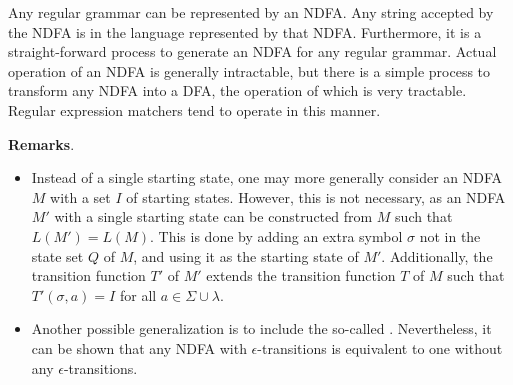 \documentclass[12pt]{article}
\begin{document}
Any regular grammar can be represented by an NDFA.  Any string accepted by the NDFA is in the language represented by that NDFA.  Furthermore, it is a straight-forward process to generate an NDFA for any regular grammar.
Actual operation of an NDFA is generally intractable, but there is a simple process to transform any NDFA into a DFA, the operation of which is very tractable.  Regular expression matchers tend to operate in this manner.

\textbf{Remarks}.  
\begin{itemize}
\item
Instead of a single starting state, one may more generally consider an NDFA $M$ with a set $I$ of starting states.  However, this is not necessary, as an NDFA $M'$ with a single starting state can be constructed from $M$ such that $L(M')=L(M)$.  This is done by adding an extra symbol $\sigma$ not in the state set $Q$ of $M$, and using it as the starting state of $M'$.  Additionally, the transition function $T'$ of $M'$ extends the transition function $T$ of $M$ such that $T'(\sigma,a)=I$ for all $a\in \Sigma\cup \lambda$.
\item
Another possible generalization is to include the so-called .  Nevertheless, it can be shown that any NDFA with $\epsilon$-transitions is equivalent to one without any $\epsilon$-transitions.
\end{itemize}
\end{document}
